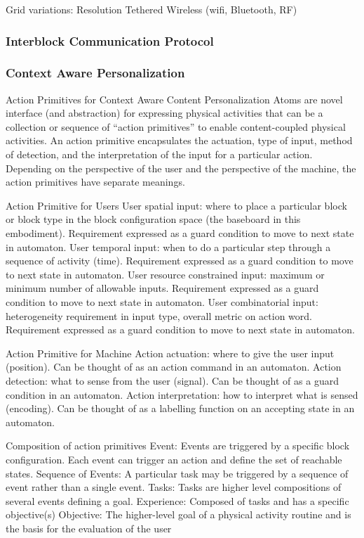 \documentclass[]{article}
\begin{document}
Grid variations:
Resolution
Tethered
Wireless (wifi, Bluetooth, RF)

\subsubsection{Interblock Communication Protocol}

\subsubsection{Context Aware Personalization}
Action Primitives for Context Aware Content Personalization
Atoms are novel interface (and abstraction) for expressing physical activities that can be a collection or sequence of “action primitives” to enable content-coupled physical activities. An action primitive encapsulates the actuation, type of input, method of detection, and the interpretation of the input for a particular action. Depending on the perspective of the user and the perspective of the machine, the action primitives have separate meanings.

Action Primitive for Users
User spatial input: where to place a particular block or block type in the block configuration space (the baseboard in this embodiment). Requirement expressed as a guard condition to move to next state in automaton.
User temporal input: when to do a particular step through a sequence of activity (time). Requirement expressed as a guard condition to move to next state in automaton.
User resource constrained input: maximum or minimum  number of allowable inputs. Requirement expressed as a guard condition to move to next state in automaton.
User combinatorial input: heterogeneity requirement in input type, overall metric on action word. Requirement expressed as a guard condition to move to next state in automaton.

Action Primitive for Machine
Action actuation: where to give the user input (position). Can be thought of as an action command in an automaton.
Action detection: what to sense from the user (signal). Can be thought of as a guard condition in an automaton.
Action interpretation: how to interpret what is sensed (encoding). Can be thought of as a labelling function on an accepting state in an automaton.

Composition of action primitives
Event:  Events are triggered by a specific block configuration. Each event can trigger an action and define the set of reachable states. 
Sequence of Events: A particular task may be triggered by a sequence of event rather than a single event. 
Tasks: Tasks are higher level compositions of several events defining a goal.
Experience: Composed of tasks and has a specific objective(s)
Objective: The higher-level goal of a physical activity routine and is the basis for the evaluation of the user
\end{document}
